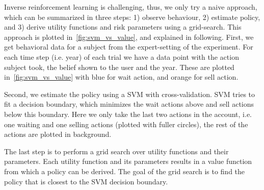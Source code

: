Inverse reinforcement learning is challenging, thus, we only try a naive approach, which can be summarized in three steps: 1) observe behaviour, 2) estimate policy, and 3) derive utility functions and risk parameters using a grid-search.
This approach is plotted in~\autoref{fig:svm_vs_value}, and explained in following. 
First, we get behavioral data for a subject from the expert-setting of the experiment.
For each time step (i.e. year) of each trial we have a data point with the action subject took, the belief shown to the user and the year. These are plotted in~\autoref{fig:svm_vs_value} with blue for wait action, and orange for sell action.

Second, we estimate the policy using a SVM \cite{TODO} with cross-validation. SVM tries to fit a decision boundary, which minimizes the wait actions above and sell actions below this boundary. Here we only take the last two actions in the account, i.e. one waiting and one selling actions (plotted with fuller circles), the rest of the actions are plotted in background.

The last step is to perform a grid search over utility functions and their parameters.
Each utility function and its parameters results in a value function from which a policy can be derived.
The goal of the grid search is to find the policy that is closest to the SVM decision boundary.

